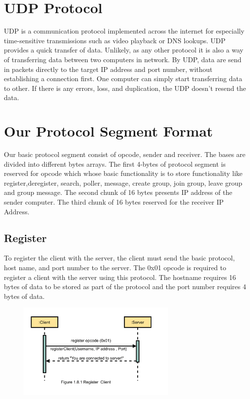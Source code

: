     \noindent

    \section{UDP Protocol}\label{sec:udp protocol}
    UDP is a communication protocol implemented across the internet for especially time-sensitive
    transmissions such as video playback or DNS lookups.
    UDP provides a quick transfer of data.
    Unlikely, as any other protocol it is also a way of transferring data between two computers in
    network.
    By UDP, data are send in packets directly to the target IP address and port number,
    without establishing a connection first.
    One computer can simply start transferring data to other.
    If there is any errors, loss, and duplication, the UDP doesn't resend the data.

    \medskip

    \noindent

    \section{Our Protocol Segment Format}\label{sec:our protocol}
    Our  basic protocol segment  consist of opcode, sender and receiver. 
    The bases are divided into different bytes arrays.
    The first 4-bytes of protocol segment is reserved for opcode which whose
    basic functionality is to store  functionality like register,deregister, search,
    poller, message, create group, join group, leave group and group message.
    The second chunk of 16 bytes presents IP address of the sender computer.
    The third chunk of 16 bytes reserved for the receiver IP Address.
    \medskip
    
    \noindent
    \subsection{Register}\label{subsec:register}
    To register the client with the server, the client must send the basic protocol, host
    name, and port number to the server.
    The 0x01 opcode is required to register a client with the server using this protocol.
    The hostname requires 16 bytes of data to be stored as part of the protocol and 
    the port number requires 4 bytes of data.
    
		    \begin{figure}
		    	\centering
		    	\includegraphics[width=0.7\textwidth]{gfx/1.8.1_Register_Client}
		    	\label{fig:register-server}
		    \end{figure}
    

